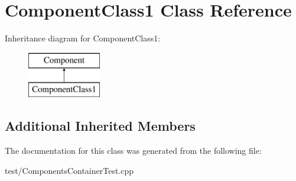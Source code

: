 \hypertarget{classComponentClass1}{}\section{Component\+Class1 Class Reference}
\label{classComponentClass1}
Inheritance diagram for Component\+Class1\+:\begin{figure}[H]
\begin{center}
\leavevmode
\includegraphics[height=2.000000cm]{classComponentClass1}
\end{center}
\end{figure}
\subsection*{Additional Inherited Members}


The documentation for this class was generated from the following file\+:\begin{DoxyCompactItemize}
\item 
test/Components\+Container\+Test.\+cpp\end{DoxyCompactItemize}
